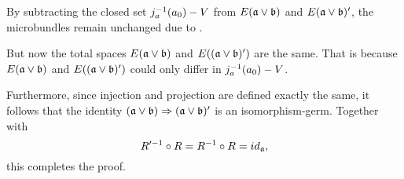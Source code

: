 \begin{myproof}
\begin{sectionize}
        By subtracting the closed set $j_a^{-1}(a_0) - V$
        from $E(\ba \vee \bb)$ and $E(\ba \vee \bb)'$,
        the microbundles remain unchanged due to .
        
        But now the total spaces $E(\ba \vee \bb)$ and $E((\ba \vee \bb)')$ are the same.
        That is because $E(\ba \vee \bb)$ and $E((\ba \vee \bb)')$
        could only differ in $j_a^{-1}(a_0) - V$.

        
        Furthermore, since injection and projection are defined exactly the same,
        it follows that the identity $\germ{(\ba \vee \bb)}{(\ba \vee \bb)'}$
        is an isomorphism-germ.
        Together with
        \[ R'^{-1} \circ R = R^{-1} \circ R = id_{\mathfrak{a}}, \]
        this completes the proof.
    \end{sectionize}
\end{myproof}